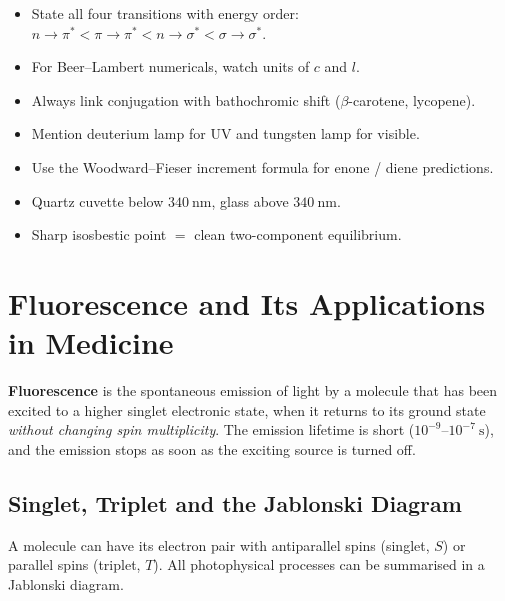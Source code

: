 \documentclass[12pt,a4paper]{article}
\begin{document}
\begin{tcolorbox}[exambox, title={Exam Points (Section 2)}]
\begin{itemize}[leftmargin=*, itemsep=2pt, topsep=2pt]
  \item State all four transitions with energy order: $n\!\to\!\pi^{*}<\pi\!\to\!\pi^{*}<n\!\to\!\sigma^{*}<\sigma\!\to\!\sigma^{*}$.
  \item For Beer--Lambert numericals, watch units of $c$ and $l$.
  \item Always link conjugation with bathochromic shift ($\beta$-carotene, lycopene).
  \item Mention deuterium lamp for UV and tungsten lamp for visible.
  \item Use the Woodward--Fieser increment formula for enone / diene predictions.
  \item Quartz cuvette below $340\ \mathrm{nm}$, glass above $340\ \mathrm{nm}$.
  \item Sharp isosbestic point $=$ clean two-component equilibrium.
\end{itemize}
\end{tcolorbox}

\section{Fluorescence and Its Applications in Medicine}

\begin{tcolorbox}[defbox]
\textbf{Fluorescence} is the spontaneous emission of light by a molecule that has been excited to a higher singlet electronic state, when it returns to its ground state \emph{without changing spin multiplicity}. The emission lifetime is short ($10^{-9}$--$10^{-7}\ \mathrm{s}$), and the emission stops as soon as the exciting source is turned off.
\end{tcolorbox}

\subsection{Singlet, Triplet and the Jablonski Diagram}
A molecule can have its electron pair with antiparallel spins (singlet, $S$) or parallel spins (triplet, $T$). All photophysical processes can be summarised in a Jablonski diagram.
\end{document}
